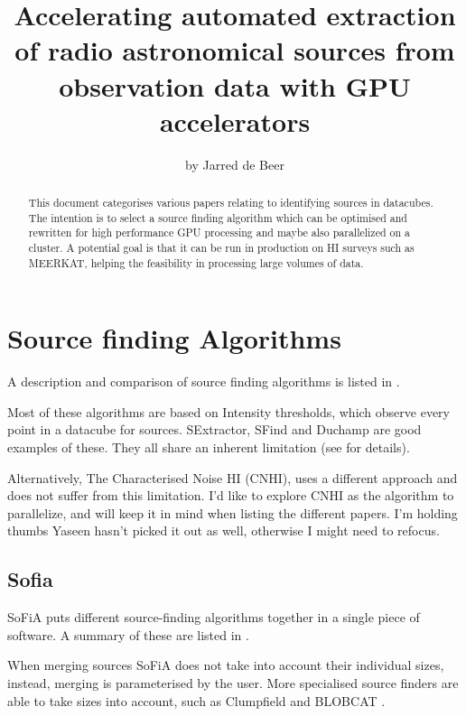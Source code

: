 \documentclass[prodmode,acmtecs]{acmsmall} %
\begin{document}
\title{Accelerating automated extraction of radio astronomical sources from observation data with GPU accelerators}
\author{by Jarred de Beer}

\begin{abstract}
This document categorises various papers relating to identifying sources in datacubes.
The intention is to select a source finding algorithm which can be optimised and rewritten for
high performance GPU processing and maybe also parallelized on a cluster. A potential goal is that
it can be run in production on HI surveys such as MEERKAT, helping the feasibility 
in processing large volumes of data.
\end{abstract}

\maketitle

\section{Source finding Algorithms}

A description and comparison of source finding algorithms is listed in \cite{popping2012comparison}.

Most of these algorithms are based on Intensity thresholds,
which observe every point in a datacube for sources. 
SExtractor, SFind and Duchamp are good examples of these. 
They all share an inherent limitation (see \cite{jurek2012characterised} for details).

Alternatively, The Characterised Noise HI (CNHI), uses a different approach and does not suffer
from this limitation. 
I'd like to explore CNHI as the algorithm to parallelize, and will
keep it in mind when listing the different papers. I'm holding thumbs Yaseen hasn't picked it out
as well, otherwise I might need to refocus.

\subsection{Sofia}

SoFiA \cite{serra2015sofia} puts different source-finding algorithms together in a single piece
of software. A summary of these are listed in \cite{koribalski2012source}.

When merging sources SoFiA does not take into account their individual sizes, instead, merging
is parameterised by the user.
More specialised source finders are able to take sizes into account, such as Clumpfield \cite{williams1994determining}
and BLOBCAT \cite{hales2012blobcat}.
\end{document}
